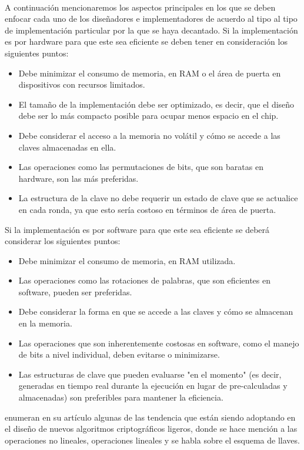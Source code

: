 \documentclass[]{article}
\begin{document}
\\ A continuación mencionaremos los aspectos principales en los que se deben enfocar cada uno de los diseñadores e implementadores de acuerdo al tipo al tipo de implementación particular por la que se haya decantado.
Si la implementación es por hardware para que este sea eficiente se deben tener en consideración los siguientes puntos:
\begin{itemize}
	\item Debe minimizar el consumo de memoria, en RAM o el área de puerta en dispositivos con recursos limitados.
	\item El tamaño de la implementación debe ser optimizado, es decir, que el diseño debe ser lo más compacto posible para ocupar menos espacio en el chip.
	\item Debe considerar el acceso a la memoria no volátil y cómo se accede a las claves almacenadas en ella.
	\item Las operaciones como las permutaciones de bits, que son baratas en hardware, son las más preferidas.
	\item La estructura de la clave no debe requerir un estado de clave que se actualice en cada ronda, ya que esto sería costoso en términos de área de puerta.
\end{itemize}
Si la implementación es por software para que este sea eficiente se deberá considerar los siguientes puntos:
\begin{itemize}
	\item Debe minimizar el consumo de memoria, en RAM utilizada.
	\item Las operaciones como las rotaciones de palabras, que son eficientes en software, pueden ser preferidas.
	\item Debe considerar la forma en que se accede a las claves y cómo se almacenan en la memoria.
	\item Las operaciones que son inherentemente costosas en software, como el manejo de bits a nivel individual, deben evitarse o minimizarse.
	\item Las estructuras de clave que pueden evaluarse "en el momento" (es decir, generadas en tiempo real durante la ejecución en lugar de pre-calculadas y almacenadas) son preferibles para mantener la eficiencia.
\end{itemize}
\cite{biryukov2017state} enumeran en su artículo algunas de las tendencia que están siendo adoptando en el diseño de nuevos algoritmos criptográficos ligeros, donde se hace mención a  las operaciones no lineales, operaciones lineales y se habla sobre el esquema de llaves.
\end{document}
